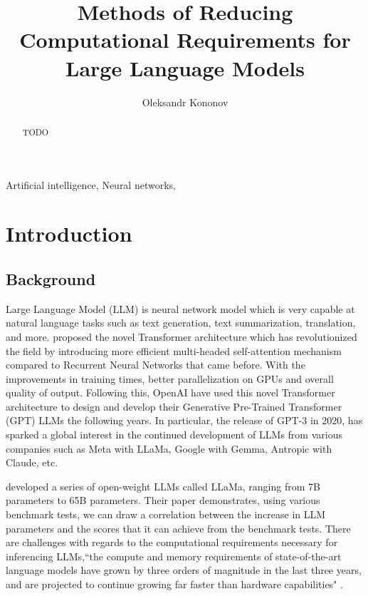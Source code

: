 \documentclass{ifacconf}
\begin{document}
	\begin{frontmatter}
		
		\title{Methods of Reducing Computational Requirements for Large Language Models} 
		
		\author[First]{Oleksandr Kononov} 
		
		\address[First]{South East Technological University, 
			Cork Road, Waterford, Ireland (e-mail: 20071032@mail.wit.ie).}
		
		\begin{abstract}                %
			TODO
		\end{abstract}
		
		\begin{keyword}
			Artificial intelligence, Neural networks, 
		\end{keyword}
		
	\end{frontmatter}
	
	\section{Introduction}
	\subsection{Background}
	Large Language Model (LLM) is neural network model which is very capable at natural language tasks such as text generation, text summarization, translation, and more. \cite{vaswani2017attentionneed} proposed the novel Transformer architecture which has revolutionized the field by introducing more efficient multi-headed self-attention mechanism compared to Recurrent Neural Networks that came before. With the improvements in training times, better parallelization on GPUs and overall quality of output.
	Following this, OpenAI have used this novel Transformer architecture to design and develop their Generative Pre-Trained Transformer (GPT) LLMs the following years. In particular, the release of GPT-3 in 2020, has sparked a global interest in the continued development of LLMs from various companies such as Meta with LLaMa, Google with Gemma, Antropic with Claude, etc.
	
	\cite{touvron2023llamaopenefficientfoundation} developed a series of open-weight LLMs called LLaMa, ranging from 7B parameters to 65B parameters. Their paper demonstrates, using various benchmark tests, we can draw a correlation between the increase in LLM parameters and the scores that it can achieve from the benchmark tests. There are challenges with regards to the computational requirements necessary for inferencing LLMs,``the compute and memory requirements of state-of-the-art language models have grown by three orders of magnitude in the last three years, and are projected to continue growing far faster than hardware capabilities" \cite[p.~97]{bommasani2022opportunitiesrisksfoundationmodels}.
	
\end{document}
